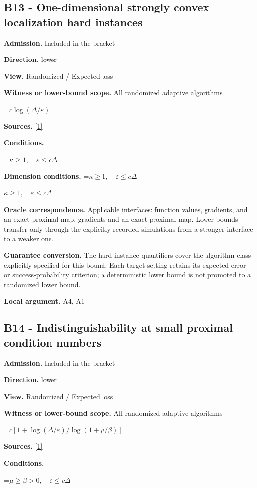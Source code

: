 \documentclass[10pt,a4paper]{article}
\newcommand{\AtlasMath}[1]{\par\begingroup\centering\setbox0=\hbox{$\displaystyle #1$}\ifdim\wd0>1.4\linewidth\typeout{ATLAS WIDE FORMULA: \the\wd0}\fi\ifdim\wd0>\linewidth\resizebox{\linewidth}{!}{\box0}\else\box0\fi\par\endgroup}
\newcommand{\AtlasInlineMath}[1]{\begingroup\setbox0=\hbox{$#1$}\ifdim\wd0>.4\linewidth\endgroup\AtlasMath{#1}\else\endgroup$#1$\fi}
\begin{document}
\subsection{B13 - One-dimensional strongly convex localization hard instances}
\textbf{Admission.} Included in the bracket

\textbf{Direction.} lower

\textbf{View.} Randomized / Expected loss

\textbf{Witness or lower-bound scope.} All randomized adaptive algorithms

\AtlasMath{c\log(\Delta/\varepsilon)}
\textbf{Sources.} \href{https://www.tau.ac.il/~becka/FISTA.pdf}{[1]}

\textbf{Conditions.} 
\AtlasMath{\kappa\ge1,\quad\varepsilon\le c\Delta}


\textbf{Dimension conditions.} \AtlasInlineMath{\kappa\ge1,\quad\varepsilon\le c\Delta}

\textbf{Oracle correspondence.} Applicable interfaces: function values, gradients, and an exact proximal map, gradients and an exact proximal map. Lower bounds transfer only through the explicitly recorded simulations from a stronger interface to a weaker one.

\textbf{Guarantee conversion.} The hard-instance quantifiers cover the algorithm class explicitly specified for this bound. Each target setting retains its expected-error or success-probability criterion; a deterministic lower bound is not promoted to a randomized lower bound.

\textbf{Local argument.} A4, A1

\subsection{B14 - Indistinguishability at small proximal condition numbers}
\textbf{Admission.} Included in the bracket

\textbf{Direction.} lower

\textbf{View.} Randomized / Expected loss

\textbf{Witness or lower-bound scope.} All randomized adaptive algorithms

\AtlasMath{c[1+\log(\Delta/\varepsilon)/\log(1+\mu/\beta)]}
\textbf{Sources.} \href{https://www.tau.ac.il/~becka/FISTA.pdf}{[1]}

\textbf{Conditions.} 
\AtlasMath{\mu\ge\beta>0,\quad\varepsilon\le c\Delta}
\end{document}
